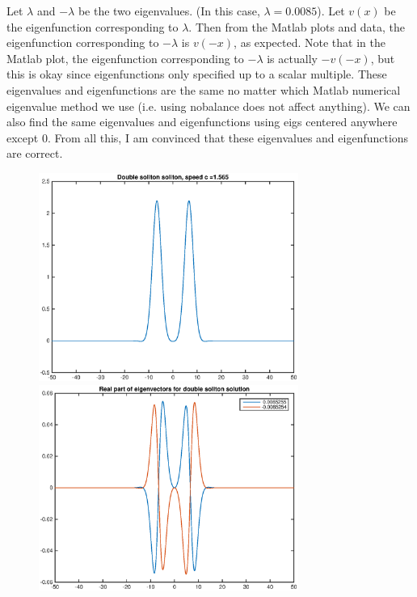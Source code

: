 \documentclass[12pt]{article}
\begin{document}
\begin{enumerate}
Let $\lambda$ and $-\lambda$ be the two eigenvalues. (In this case, $\lambda = 0.0085$). Let $v(x)$ be the eigenfunction corresponding to $\lambda$. Then from the Matlab plots and data, the eigenfunction corresponding to $-\lambda$ is $v(-x)$, as expected. Note that in the Matlab plot, the eigenfunction corresponding to $-\lambda$ is actually $-v(-x)$, but this is okay since eigenfunctions only specified up to a scalar multiple. These eigenvalues and eigenfunctions are the same no matter which Matlab numerical eigenvalue method we use (i.e. using \textrm{nobalance} does not affect anything). We can also find the same eigenvalues and eigenfunctions using \textrm{eigs} centered anywhere except 0. From all this, I am convinced that these eigenvalues and eigenfunctions are correct.

\begin{figure}[H]
\includegraphics[width=8.5cm]{double1.eps}
\includegraphics[width=8.5cm]{double1vec.eps}
\end{figure}


\end{enumerate}
\end{document}
